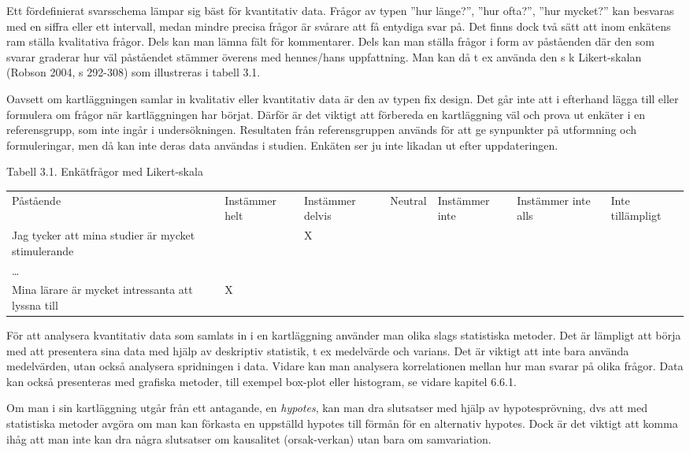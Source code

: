 Ett fördefinierat svarsschema lämpar sig bäst för kvantitativ data.
Frågor av typen ''hur länge?'', ''hur ofta?'', ''hur mycket?'' kan
besvaras med en siffra eller ett intervall, medan mindre precisa frågor
är svårare att få entydiga svar på. Det finns dock två sätt att inom
enkätens ram ställa kvalitativa frågor. Dels kan man lämna fält för
kommentarer. Dels kan man ställa frågor i form av påståenden där den som
svarar graderar hur väl påståendet stämmer överens med hennes/hans
uppfattning. Man kan då t ex använda den s k Likert-skalan (Robson 2004,
s 292-308) som illustreras i tabell 3.1.

Oavsett om kartläggningen samlar in kvalitativ eller kvantitativ data är
den av typen fix design. Det går inte att i efterhand lägga till eller
formulera om frågor när kartläggningen har börjat. Därför är det viktigt
att förbereda en kartläggning väl och prova ut enkäter i en
referensgrupp, som inte ingår i undersökningen. Resultaten från
referensgruppen används för att ge synpunkter på utformning och
formuleringar, men då kan inte deras data användas i studien. Enkäten
ser ju inte likadan ut efter uppdateringen.

Tabell 3.1. Enkätfrågor med Likert-skala

\begin{longtable}[]{@{}lllllll@{}}
\toprule
Påstående & Instämmer helt & Instämmer delvis & Neutral & Instämmer inte
& Instämmer inte alls & Inte tillämpligt\tabularnewline
Jag tycker att mina studier är mycket stimulerande & & X & & &
&\tabularnewline
\ldots{} & & & & & &\tabularnewline
Mina lärare är mycket intressanta att lyssna till & X & & & &
&\tabularnewline
\bottomrule
\end{longtable}

För att analysera kvantitativ data som samlats in i en kartläggning
använder man olika slags statistiska metoder. Det är lämpligt att börja
med att presentera sina data med hjälp av deskriptiv statistik, t ex
medelvärde och varians. Det är viktigt att inte bara använda
medelvärden, utan också analysera spridningen i data. Vidare kan man
analysera korrelationen mellan hur man svarar på olika frågor. Data kan
också presenteras med grafiska metoder, till exempel box-plot eller
histogram, se vidare kapitel 6.6.1.

Om man i sin kartläggning utgår från ett antagande, en \emph{hypotes},
kan man dra slutsatser med hjälp av hypotesprövning, dvs att med
statistiska metoder avgöra om man kan förkasta en uppställd hypotes till
förmån för en alternativ hypotes. Dock är det viktigt att komma ihåg att
man inte kan dra några slutsatser om kausalitet (orsak-verkan) utan bara
om samvariation.

